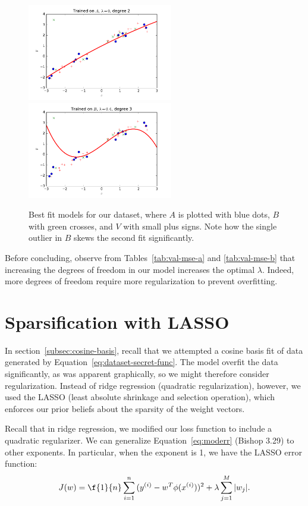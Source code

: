 \documentclass{article}
\begin{document}
\begin{multicols}{2}
\begin{figure}
   \centering
   \includegraphics[width=2.5in]{img/3-2_lambda0_degree2.pdf}
   \includegraphics[width=2.5in]{img/3-2_lambda6_degree3.pdf}
   \caption{Best fit models for our dataset, where $A$ is plotted with blue dots, $B$ with green crosses, and $V$ with small plus signs. Note how the single outlier in $B$ skews the second fit significantly.}
   \label{fig:3-2-bestfit}
\end{figure}

Before concluding, observe from Tables~\ref{tab:val-mse-a} and \ref{tab:val-mse-b} that increasing the degrees of freedom in our model increases the optimal $\lambda$. Indeed, more degrees of freedom require more regularization to prevent overfitting.



\section{Sparsification with LASSO}
\label{sec:lasso}

In section~\ref{subsec:cosine-basis}, recall that we attempted a cosine basis fit of data generated by Equation~\ref{eq:dataset-secret-func}.
The model overfit the data significantly, as was apparent graphically, so we might therefore consider regularization.
Instead of ridge regression (quadratic regularization), however, we used the LASSO (least absolute shrinkage and selection operation), which enforces our prior beliefs about the sparsity of the weight vectors.

Recall that in ridge regression, we modified our loss function to include a quadratic regularizer. We can generalize Equation~\ref{eq:moderr} (Bishop 3.29) to other exponents. In particular, when the exponent is 1, we have the LASSO error function:
\begin{equation}J(w) = \f{1}{n}\sum_{i=1}^n{(y^{(i)}-w^T\phi(x^{(i)}))^2} + \lambda \sum_{j=1}^M{|w_j|}.\end{equation}


\end{multicols}
\end{document}
